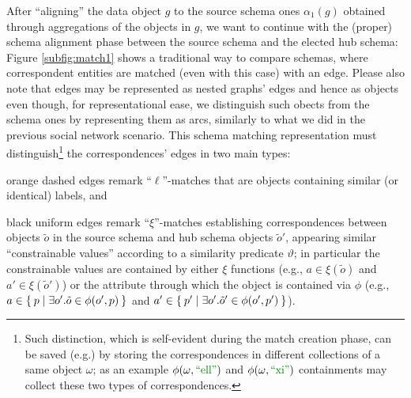 \begin{example}[continues=ex:examplegraphdata,label=ex:examplereferencedOcaml]
After ``aligning'' the data object $g$ to the source schema ones $\alpha_1(g)$ obtained through aggregations of the objects in $g$, we want to continue with the (proper) schema alignment phase between the source schema and the elected hub schema: Figure \vref{subfig:match1} shows a traditional way to compare schemas, where correspondent entities are matched (even with this case) with an edge. Please also note that edges may be represented as nested graphs' edges and hence as objects even though, for representational ease, we distinguish such obects from the schema ones by representing them as arcs, similarly to what we did in the previous social network scenario. This schema matching representation must  distinguish\footnote{Such distinction, which is self-evident during the match creation phase, can be saved (e.g.) by storing the correspondences in different collections of a same object $\omega$; as an example $\phi(\omega,\mstr{ell})$ and $\phi(\omega,\mstr{xi})$ containments may collect these two types of correspondences.} the correspondences' edges in two main types: 
\begin{myalist}
\item orange dashed edges remark ``$\ell$''-matches that are objects containing similar (or identical) labels, and 
\item black uniform edges remark ``$\xi$''-matches establishing correspondences between %
objects $\tilde{o}$ in the source schema %
 and hub schema objects $\tilde{o}'$, appearing similar ``constrainable values''  according to a similarity predicate $\vartheta$; in particular the constrainable values are contained by either $\xi$ functions (e.g.,  $a\in\xi(\tilde{o})$ and $a'\in\xi(\tilde{o}')$) or the attribute through which the object is contained via $\phi$  (e.g., $a\in\Set{p| \exists o'.\tilde{o}\in \phi(o',p)}$ and $a'\in\Set{p'| \exists o'.\tilde{o}'\in \phi(o',p')}$).
\end{myalist}

\end{example}
